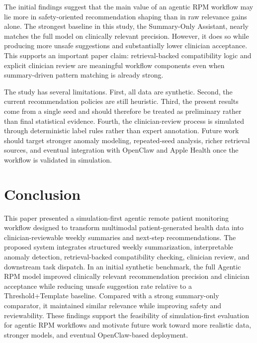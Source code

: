 \documentclass[conference]{IEEEtran}
\begin{document}
The initial findings suggest that the main value of an agentic RPM workflow may lie more in safety-oriented recommendation shaping than in raw relevance gains alone. The strongest baseline in this study, the Summary-Only Assistant, nearly matches the full model on clinically relevant precision. However, it does so while producing more unsafe suggestions and substantially lower clinician acceptance. This supports an important paper claim: retrieval-backed compatibility logic and explicit clinician review are meaningful workflow components even when summary-driven pattern matching is already strong.

The study has several limitations. First, all data are synthetic. Second, the current recommendation policies are still heuristic. Third, the present results come from a single seed and should therefore be treated as preliminary rather than final statistical evidence. Fourth, the clinician-review process is simulated through deterministic label rules rather than expert annotation. Future work should target stronger anomaly modeling, repeated-seed analysis, richer retrieval sources, and eventual integration with OpenClaw and Apple Health once the workflow is validated in simulation.

\section{Conclusion}

This paper presented a simulation-first agentic remote patient monitoring workflow designed to transform multimodal patient-generated health data into clinician-reviewable weekly summaries and next-step recommendations. The proposed system integrates structured weekly summarization, interpretable anomaly detection, retrieval-backed compatibility checking, clinician review, and downstream task dispatch. In an initial synthetic benchmark, the full Agentic RPM model improved clinically relevant recommendation precision and clinician acceptance while reducing unsafe suggestion rate relative to a Threshold+Template baseline. Compared with a strong summary-only comparator, it maintained similar relevance while improving safety and reviewability. These findings support the feasibility of simulation-first evaluation for agentic RPM workflows and motivate future work toward more realistic data, stronger models, and eventual OpenClaw-based deployment.



\end{document}
